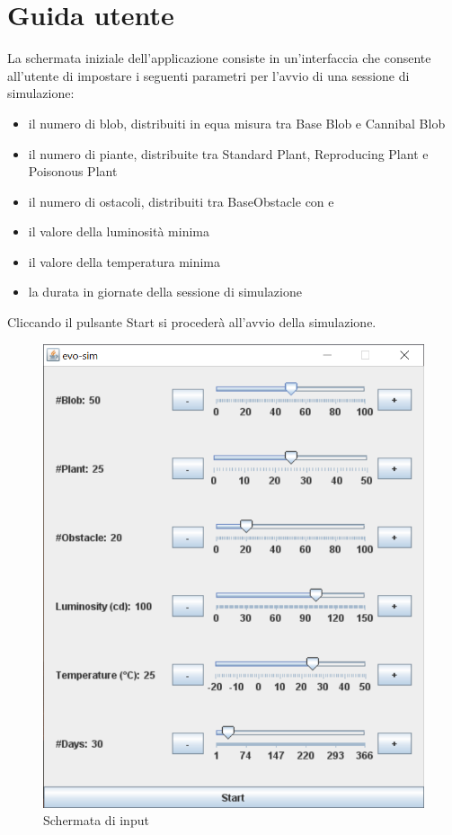 \chapter{Guida utente}

La schermata iniziale dell'applicazione consiste in un'interfaccia che consente all'utente di impostare i seguenti parametri per l'avvio di una sessione di simulazione:
\begin{itemize}
\item il numero di blob, distribuiti in equa misura tra Base Blob e Cannibal Blob
\item il numero di piante, distribuite tra Standard Plant, Reproducing Plant e Poisonous Plant
\item il numero di ostacoli, distribuiti tra BaseObstacle con  e 
\item il valore della luminosità minima
\item il valore della temperatura minima
\item la durata in giornate della sessione di simulazione
\end{itemize}

Cliccando il pulsante Start si procederà all'avvio della simulazione.

\begin{figure}[h!]
\centering
\includegraphics[scale=0.5]{img/InputInterface.png}
\caption{Schermata di input}
\label{fig:InputInterface}
\end{figure}

